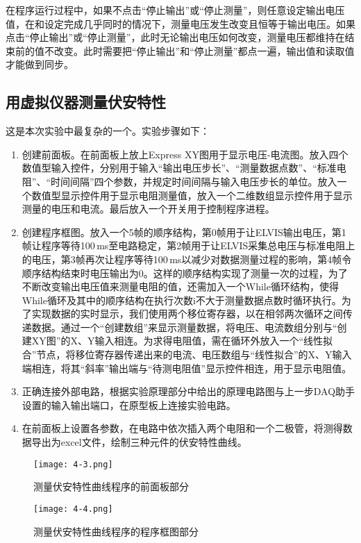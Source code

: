 \documentclass[12pt]{article}
\begin{document}
在程序运行过程中，如果不点击“停止输出”或“停止测量”，则任意设定输出电压值，在和设定完成几乎同时的情况下，测量电压发生改变且恒等于输出电压。如果点击“停止输出”或“停止测量”，此时无论输出电压如何改变，测量电压都维持在结束前的值不改变。此时需要把“停止输出”和“停止测量”都点一遍，输出值和读取值才能做到同步。

\subsection{用虚拟仪器测量伏安特性}
这是本次实验中最复杂的一个。实验步骤如下：
\begin{enumerate}
    \item 创建前面板。在前面板上放上Express XY图用于显示电压-电流图。放入四个数值型输入控件，分别用于输入“输出电压步长”、“测量数据点数”、“标准电阻”、“时间间隔”四个参数，并规定时间间隔与输入电压步长的单位。放入一个数值型显示控件用于显示电阻测量值，放入一个二维数组显示控件用于显示测量的电压和电流。最后放入一个开关用于控制程序进程。
    \item 创建程序框图。放入一个5帧的顺序结构，第0帧用于让ELVIS输出电压，第1帧让程序等待100\,ms至电路稳定，第2帧用于让ELVIS采集总电压与标准电阻上的电压，第3帧再次让程序等待100\,ms以减少对数据测量过程的影响，第4帧令顺序结构结束时电压输出为0。这样的顺序结构实现了测量一次的过程，为了不断改变输出电压值来测量电阻的值，还需加入一个While循环结构，使得While循环及其中的顺序结构在执行次数i不大于测量数据点数时循环执行。为了实现数据的实时显示，我们使用两个移位寄存器，以在相邻两次循环之间传递数据。通过一个“创建数组”来显示测量数据，将电压、电流数组分别与“创建XY图”的X、Y输入相连。为求得电阻值，需在循环外放入一个“线性拟合”节点，将移位寄存器传递出来的电流、电压数组与“线性拟合”的X、Y输入端相连，将其“斜率”输出端与“待测电阻值”显示控件相连，用于显示电阻值。
    \item 正确连接外部电路，根据实验原理部分中给出的原理电路图与上一步DAQ助手设置的输入输出端口，在原型板上连接实验电路。
    \item 在前面板上设置各参数，在电路中依次插入两个电阻和一个二极管，将测得数据导出为excel文件，绘制三种元件的伏安特性曲线。
\end{enumerate}

\begin{figure}[htbp]
    \centering
    \texttt{[image: 4-3.png]}
    \caption{测量伏安特性曲线程序的前面板部分}
\end{figure}

\begin{figure}[htbp]
    \centering
    \texttt{[image: 4-4.png]}
    \caption{测量伏安特性曲线程序的程序框图部分}
\end{figure}
\end{document}
